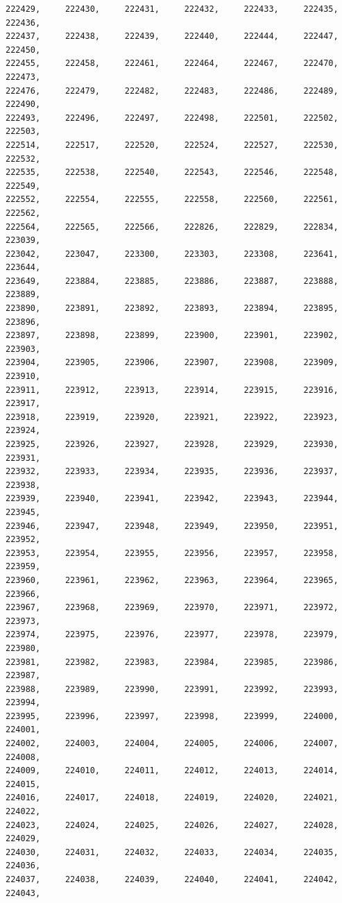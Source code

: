 \documentclass[a4paper,11pt]{report}
\begin{document}
\begin{verbatim}
222429,     222430,     222431,     222432,     222433,     222435,     222436,
222437,     222438,     222439,     222440,     222444,     222447,     222450,
222455,     222458,     222461,     222464,     222467,     222470,     222473,
222476,     222479,     222482,     222483,     222486,     222489,     222490,
222493,     222496,     222497,     222498,     222501,     222502,     222503,
222514,     222517,     222520,     222524,     222527,     222530,     222532,
222535,     222538,     222540,     222543,     222546,     222548,     222549,
222552,     222554,     222555,     222558,     222560,     222561,     222562,
222564,     222565,     222566,     222826,     222829,     222834,     223039,
223042,     223047,     223300,     223303,     223308,     223641,     223644,
223649,     223884,     223885,     223886,     223887,     223888,     223889,
223890,     223891,     223892,     223893,     223894,     223895,     223896,
223897,     223898,     223899,     223900,     223901,     223902,     223903,
223904,     223905,     223906,     223907,     223908,     223909,     223910,
223911,     223912,     223913,     223914,     223915,     223916,     223917,
223918,     223919,     223920,     223921,     223922,     223923,     223924,
223925,     223926,     223927,     223928,     223929,     223930,     223931,
223932,     223933,     223934,     223935,     223936,     223937,     223938,
223939,     223940,     223941,     223942,     223943,     223944,     223945,
223946,     223947,     223948,     223949,     223950,     223951,     223952,
223953,     223954,     223955,     223956,     223957,     223958,     223959,
223960,     223961,     223962,     223963,     223964,     223965,     223966,
223967,     223968,     223969,     223970,     223971,     223972,     223973,
223974,     223975,     223976,     223977,     223978,     223979,     223980,
223981,     223982,     223983,     223984,     223985,     223986,     223987,
223988,     223989,     223990,     223991,     223992,     223993,     223994,
223995,     223996,     223997,     223998,     223999,     224000,     224001,
224002,     224003,     224004,     224005,     224006,     224007,     224008,
224009,     224010,     224011,     224012,     224013,     224014,     224015,
224016,     224017,     224018,     224019,     224020,     224021,     224022,
224023,     224024,     224025,     224026,     224027,     224028,     224029,
224030,     224031,     224032,     224033,     224034,     224035,     224036,
224037,     224038,     224039,     224040,     224041,     224042,     224043,

\end{verbatim}
\end{document}
